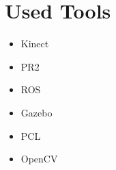 \section{Used Tools}
\begin{itemize}
\item Kinect
\item PR2
\item ROS
\item Gazebo
\item PCL
\item OpenCV
\end{itemize}






